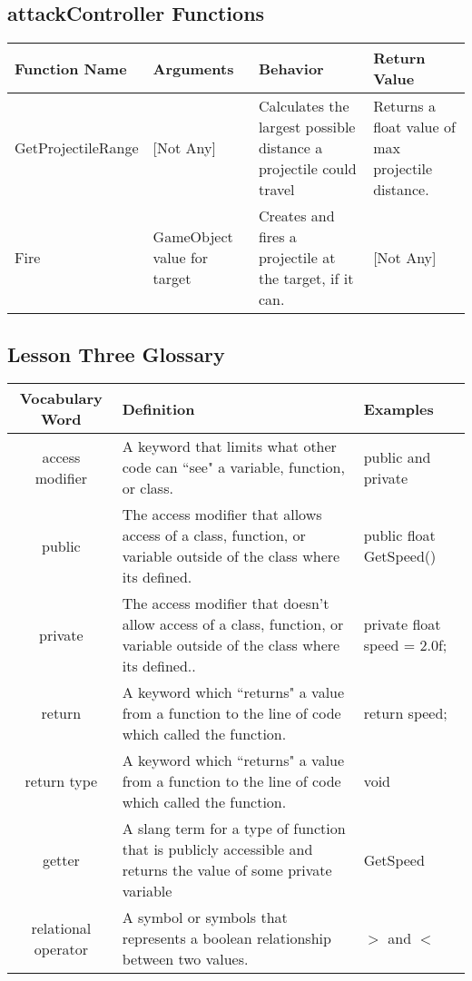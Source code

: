 \documentclass{article}
\begin{document}
\subsection{attackController Functions}

\begin{center}
\begin{tabular}{ | m{3.3cm} | m{2.2cm} | m{4cm} | m{4cm} | } 
 \hline
 Function Name & Arguments & Behavior & Return Value \\ 
  \hline
 GetProjectileRange & [Not Any]  & Calculates the largest possible distance a projectile could travel & Returns a float value of max projectile distance. \\ 
 \hline
  Fire & GameObject value for target & Creates and fires a projectile at the target, if it can. & [Not Any] \\ 
 \hline
\end{tabular}
\end{center}

\subsection{Lesson Three Glossary}
\begin{center}
\begin{tabular}{ | c | m{5cm}  | m{5cm} | } 
 \hline
 Vocabulary Word & Definition & Examples \\ 
  \hline
 access modifier & A keyword that limits what other code can ``see" a variable, function, or class. & public and private \\ 
  \hline
 public & The access modifier that allows access of a class, function, or variable outside of the class where its defined. & public float GetSpeed() \\ 
 \hline
 private & The access modifier that doesn't allow access of a class, function, or variable outside of the class where its defined.. & private float speed = 2.0f; \\ 
 \hline
 return  & A keyword which ``returns" a value from a function to the line of code which called the function. & return speed; \\ 
 \hline
 return type  & A keyword which ``returns" a value from a function to the line of code which called the function. & void \\ 
 \hline
  getter  & A slang term for a type of function that is publicly accessible and returns the value of some private variable
 & GetSpeed \\ 
 \hline
  relational operator & A symbol or symbols that represents a boolean relationship between two values. & $>$ and $<$ \\
 \hline
\end{tabular}
\end{center}
\end{document}
